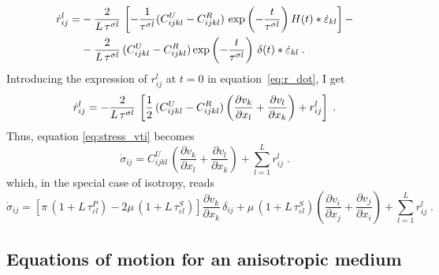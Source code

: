 \begin{equation}
\allowdisplaybreaks
    \begin{split}
    \dot{r}_{ij}^l = &-\frac{2}{L\,\tau^{\sigma l}}\, \left[ -\frac{1}{\tau^{\sigma l}}(C_{ijkl}^U-C_{ijkl}^R)\,\exp\left(-\frac{t}{\tau^{\sigma l}}\right)H(t) \ast \dot{\varepsilon}_{kl} \right] - \\
    &- \frac{2}{L\,\tau^{\sigma l}}\,(C_{ijkl}^U-C_{ijkl}^R)\exp\left(-\frac{t}{\tau^{\sigma l}}\right)\,\delta(t) \ast \dot{\varepsilon}_{kl}\;.
    \end{split}
    \label{eq:r_dot}
\end{equation}
Introducing the expression of $r_{ij}^l$ at $t=0$ in equation~\ref{eq:r_dot}, I get
\begin{equation}
\allowdisplaybreaks
    \dot{r}_{ij}^l = - \frac{2}{L\,\tau^{\sigma l}}\,\left[ \frac{1}{2}\,(C_{ijkl}^U-C_{ijkl}^R)\left(\frac{\partial v_k}{\partial x_l}+\frac{\partial v_l}{\partial x_k}\right)+r_{ij}^l \right]\;.
    \label{eq:final_r_dot}
\end{equation}
Thus, equation \ref{eq:stress_vti} becomes
\begin{equation}
    \dot{\sigma}_{ij} = C_{ijkl}^U\,\left(\frac{\partial v_k}{\partial x_l}+\frac{\partial v_l}{\partial x_k}\right)+\sum_{l=1}^{L}r_{ij}^l\;.
    \label{eq:stress_vti_final}
\end{equation}
which, in the special case of isotropy, reads
\begin{equation}
    \dot \sigma_{ij} = \left[\pi\,(1+L\,\tau_{\varepsilon l}^P)-2\mu\,(1+L\,\tau_{\varepsilon l}^S)\right]\frac{\partial v_k}{\partial x_k}\,\delta_{ij} + \mu\,(1+L\,\tau_{\varepsilon l}^S)\left(\frac{\partial v_i}{\partial x_j}+\frac{\partial v_j}{\partial x_i}\right) + \sum_{l=1}^{L}r_{ij}^l\;.
\end{equation}

\subsection{Equations of motion for an anisotropic medium}
\label{ch:anisotropy}


